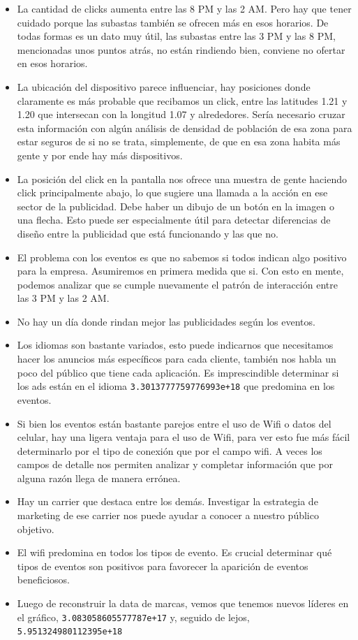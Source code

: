 \documentclass[a4paper, 12pt]{article}
\begin{document}
{{\begin{itemize}
    es un problema de compatibilidad de las apps que se ofrecen y su disponibilidad en el otro SO.
    \item La cantidad de clicks aumenta entre las 8 PM y las 2 AM. Pero hay que tener cuidado porque las subastas también se
    ofrecen más en esos horarios. De todas formas es un dato muy útil, las subastas entre las 3 PM y las 8 PM, mencionadas
    unos puntos atrás, no están rindiendo bien, conviene no ofertar en esos horarios.
    \item La ubicación del dispositivo parece influenciar, hay posiciones donde claramente es más probable que recibamos un click,
    entre las latitudes 1.21 y 1.20 que intersecan con la longitud 1.07 y alrededores. Sería necesario cruzar esta información
    con algún análisis de densidad de población de esa zona para estar seguros de si no se trata, simplemente, de que en esa zona
    habita más gente y por ende hay más dispositivos.
    \item La posición del click en la pantalla nos ofrece una muestra de gente haciendo click principalmente abajo, lo que
    sugiere una llamada a la acción en ese sector de la publicidad. Debe haber un dibujo de un botón en la imagen o una flecha.
    Esto puede ser especialmente útil para detectar diferencias de diseño entre la publicidad que está funcionando y las que no.
    \item El problema con los eventos es que no sabemos si todos indican algo positivo para la empresa. Asumiremos en primera
    medida que si. Con esto en mente, podemos analizar que se cumple nuevamente el patrón de interacción entre las 3 PM y las
    2 AM.
    \item No hay un día donde rindan mejor las publicidades según los eventos.
    \item Los idiomas son bastante variados, esto puede indicarnos que necesitamos hacer los anuncios más específicos para
    cada cliente, también nos habla un poco del público que tiene cada aplicación. Es imprescindible determinar si los ads
    están en el idioma \texttt{3.3013777759776993e+18} que predomina en los eventos.
    \item Si bien los eventos están bastante parejos entre el uso de Wifi o datos del celular, hay una ligera ventaja para
    el uso de Wifi, para ver esto fue más fácil determinarlo por el tipo de conexión que por el campo wifi. A veces los campos
    de detalle nos permiten analizar y completar información que por alguna razón llega de manera errónea.
    \item Hay un carrier que destaca entre los demás. Investigar la estrategia de marketing de ese carrier nos puede ayudar
    a conocer a nuestro público objetivo.
    \item El wifi predomina en todos los tipos de evento. Es crucial determinar qué tipos de eventos son positivos para
    favorecer la aparición de eventos beneficiosos.
    \item Luego de reconstruir la data de marcas, vemos que tenemos nuevos líderes en el gráfico, \texttt{3.083058605577787e+17}
    y, seguido de lejos, \texttt{5.951324980112395e+18}
\end{itemize}

}}
\end{document}
